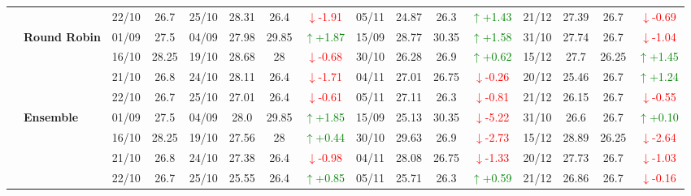 {\begin{longtable}{llcc|cccc|cccc|cccc}
&
& 22/10 & 26.7 & 25/10 & 28.31 & 26.4 & \textcolor{red}{\(\downarrow\)-1.91} & 05/11 & 24.87 & 26.3 & \textcolor{green}{\(\uparrow\)+1.43} & 21/12 & 27.39 & 26.7 & \textcolor{red}{\(\downarrow\)-0.69} \\
\cmidrule(lr){2-16}


& \textbf{Round Robin}
& 01/09 & 27.5 & 04/09 & 27.98 & 29.85 & \textcolor{green}{\(\uparrow\)+1.87} & 15/09 & 28.77 & 30.35 & \textcolor{green}{\(\uparrow\)+1.58} & 31/10 & 27.74 & 26.7 & \textcolor{red}{\(\downarrow\)-1.04} \\

& 
& 16/10 & 28.25 & 19/10 & 28.68 & 28 & \textcolor{red}{\(\downarrow\)-0.68} & 30/10 & 26.28 & 26.9 & \textcolor{green}{\(\uparrow\)+0.62} & 15/12 & 27.7 & 26.25 & \textcolor{green}{\(\uparrow\)+1.45} \\

& 
& 21/10 & 26.8 & 24/10 & 28.11 & 26.4 & \textcolor{red}{\(\downarrow\)-1.71} & 04/11 & 27.01 & 26.75 & \textcolor{red}{\(\downarrow\)-0.26} & 20/12 & 25.46 & 26.7 & \textcolor{green}{\(\uparrow\)+1.24} \\

&
& 22/10 & 26.7 & 25/10 & 27.01 & 26.4 & \textcolor{red}{\(\downarrow\)-0.61} & 05/11 & 27.11 & 26.3 & \textcolor{red}{\(\downarrow\)-0.81} & 21/12 & 26.15 & 26.7 & \textcolor{red}{\(\downarrow\)-0.55} \\
\cmidrule(lr){2-16}


& \textbf{Ensemble}
& 01/09 & 27.5 & 04/09 & 28.0 & 29.85& \textcolor{green}{\(\uparrow\)+1.85} & 15/09 & 25.13 & 30.35 & \textcolor{red}{\(\downarrow\)-5.22} & 31/10 & 26.6 & 26.7 & \textcolor{green}{\(\uparrow\)+0.10} \\

& 
& 16/10 & 28.25 & 19/10 & 27.56 & 28 & \textcolor{green}{\(\uparrow\)+0.44} & 30/10 & 29.63 & 26.9 & \textcolor{red}{\(\downarrow\)-2.73} & 15/12 & 28.89 & 26.25 & \textcolor{red}{\(\downarrow\)-2.64} \\

& 
& 21/10 & 26.8 & 24/10 & 27.38 & 26.4 & \textcolor{red}{\(\downarrow\)-0.98} & 04/11 & 28.08 & 26.75 & \textcolor{red}{\(\downarrow\)-1.33} & 20/12 & 27.73 & 26.7 & \textcolor{red}{\(\downarrow\)-1.03} \\

&
& 22/10 & 26.7 & 25/10 & 25.55 & 26.4 & \textcolor{green}{\(\uparrow\)+0.85} & 05/11 & 25.71 & 26.3 & \textcolor{green}{\(\uparrow\)+0.59} & 21/12 & 26.86 & 26.7 & \textcolor{red}{\(\downarrow\)-0.16} \\
\midrule




\end{longtable}}
